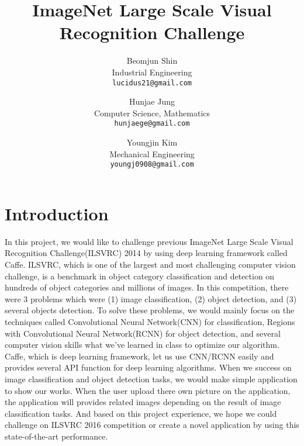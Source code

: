 \documentclass[10pt,twocolumn,letterpaper]{article}
\begin{document}
\title{ImageNet Large Scale Visual Recognition Challenge}

\author{Beomjun Shin\\
Industrial Engineering\\
{\tt\small lucidus21@gmail.com}
\and
Hunjae Jung\\
Computer Science, Mathematics\\
{\tt\small hunjaege@gmail.com}
\and
Youngjin Kim\\
Mechanical Engineering\\
{\tt\small youngj0908@gmail.com}
}

\maketitle

\section{Introduction}

In this project, we would like to challenge previous ImageNet Large Scale Visual Recognition Challenge(ILSVRC) 2014 by using deep learning framework called Caffe.
ILSVRC, which is one of the largest and most challenging computer vision challenge, is a benchmark in object category classification and detection on hundreds of object categories and millions of images.
In this competition, there were 3 problems which were (1) image classification, (2) object detection, and (3) several objects detection.
To solve these problems, we would mainly focus on the techniques called Convolutional Neural Network(CNN) for classification, Regions with Convolutional Neural Network(RCNN) for object detection, and several computer vision skills what we've learned in class to optimize our algorithm.
Caffe, which is deep learning framework, let us use CNN/RCNN easily and provides several API function for deep learning algorithms.
When we success on image classification and object detection tasks, we would make simple application to show our works.
When the user upload there own picture on the application, the application will provides related images depending on the result of image classification tasks.
And based on this project experience, we hope we could challenge on ILSVRC 2016 competition or create a novel application by using this state-of-the-art performance.

\end{document}
